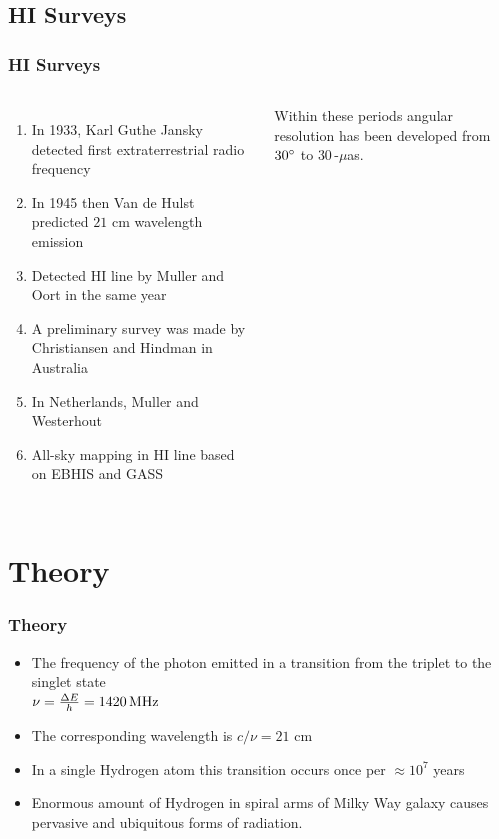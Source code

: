 \documentclass{beamer}
\begin{document}

\subsection{HI Surveys}

\begin{frame}
\frametitle{HI Surveys}
\begin{columns}[c] %

\begin{enumerate}
\item In 1933, Karl Guthe Jansky detected first extraterrestrial radio frequency
\item In 1945 then Van de Hulst predicted $21$ cm wavelength emission
\item Detected HI line by Muller and Oort in the same year
\item A preliminary survey was made by Christiansen and Hindman in Australia
\item In Netherlands, Muller and Westerhout
\item All-sky mapping in HI line based on EBHIS and GASS
\end{enumerate}

Within these periods angular resolution has been developed from $30\degree$ to $30$\,-$\mu$as\cite{kellermann2001development,Middelberg2008}.

\end{columns}
\end{frame}


\section{Theory}


\begin{frame}
\frametitle{Theory}
\begin{theorem}
\begin{itemize}
\item The frequency of the photon emitted in a transition from the triplet to the singlet state\cite{griffiths2016introduction}\\
$\mathit{\nu}=\frac{\Delta\-E}{h}=\SI{1420}{MHz}$
\item The corresponding wavelength is $c/\nu=21$ cm
\item In a single Hydrogen atom this transition occurs once per $\approx10^{7}$ years 
\item Enormous amount of Hydrogen in spiral arms of Milky Way galaxy causes pervasive and ubiquitous forms of radiation.
\end{itemize}
\end{theorem}
\end{frame}
\end{document}
